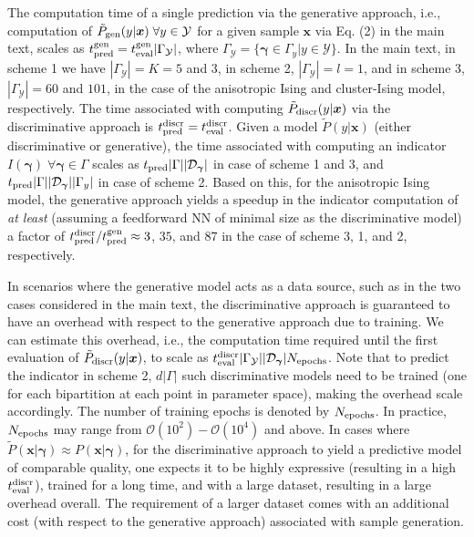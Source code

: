 \documentclass[twocolumn,aps,pra,superscriptaddress,tightlines,nofootinbib]{revtex4-2}
\begin{document}
	\indent The computation time of a single prediction via the generative approach, i.e., computation of $\tilde{P}_{\rm gen}(y|\bm{x}) \; \forall y \in \mathcal{Y}$ for a given sample $\bm{x}$ via Eq. (2) in the main text, scales as $t^{\rm gen}_{\rm pred} =  t^{\rm gen}_{\rm eval} | \Gamma_{\mathcal{Y}}| $, where $\Gamma_{\mathcal{Y}}= \{ \bm{\gamma} \in \Gamma_{y}| y \in \mathcal{Y}\}$. In the main text, in scheme 1 we have $| \Gamma_{\mathcal{Y}}| = K = 5$ and $3$, in scheme 2, $| \Gamma_{\mathcal{Y}}| = l = 1$, and in scheme 3, $| \Gamma_{\mathcal{Y}}| = 60$ and $101$, in the case of the anisotropic Ising and cluster-Ising model, respectively. The time associated with computing $\tilde{P}_{\rm discr}(y|\bm{x})$ via the discriminative approach is $t^{\rm discr}_{\rm pred} = t^{\rm discr}_{\rm eval}$. Given a model $\tilde{P}(y|\bm{x})$ (either discriminative or generative), the time associated with computing an indicator $I(\bm{\gamma}) \; \forall \bm{\gamma} \in \Gamma$ scales as $t_{\rm pred} |\Gamma| |\mathcal{D}_{\bm{\gamma}}|$ in case of scheme 1 and 3, and $t_{\rm pred} |\Gamma| |\mathcal{D}_{\bm{\gamma}}||\Gamma_{y}|$ in case of scheme 2. Based on this, for the anisotropic Ising model, the generative approach yields a speedup in the indicator computation of \textit{at least} (assuming a feedforward NN of minimal size as the discriminative model) a factor of $ t_{\rm pred}^{\rm discr}/t_{\rm pred}^{\rm gen} \approx 3$, $35$, and $87$ in the case of scheme 3, 1, and 2, respectively.
	
	\indent In scenarios where the generative model acts as a data source, such as in the two cases considered in the main text, the discriminative approach is guaranteed to have an overhead with respect to the generative approach due to training. We can estimate this overhead, i.e., the computation time required until the first evaluation of $\tilde{P}_{\rm discr}(y|\bm{x})$, to scale as $t^{\rm discr}_{\rm eval} | \Gamma_{\mathcal{Y}}| |\mathcal{D}_{\bm{\gamma}}|N_{\rm epochs}$. Note that to predict the indicator in scheme 2, $d |\Gamma|$ such discriminative models need to be trained (one for each bipartition at each point in parameter space), making the overhead scale accordingly. The number of training epochs is denoted by $N_{\rm epochs}$. In practice, $N_{\rm epochs}$ may range from $\mathcal{O}(10^2) - \mathcal{O}(10^4)$ and above. In cases where $\tilde{P}(\bm{x}|\bm{\gamma}) \approx P(\bm{x}|\bm{\gamma})$, for the discriminative approach to yield a predictive model of comparable quality, one expects it to be highly expressive (resulting in a high $t^{\rm discr}_{\rm eval}$), trained for a long time, and with a large dataset, resulting in a large overhead overall. The requirement of a larger dataset comes with an additional cost (with respect to the generative approach) associated with sample generation. 
	
\end{document}
